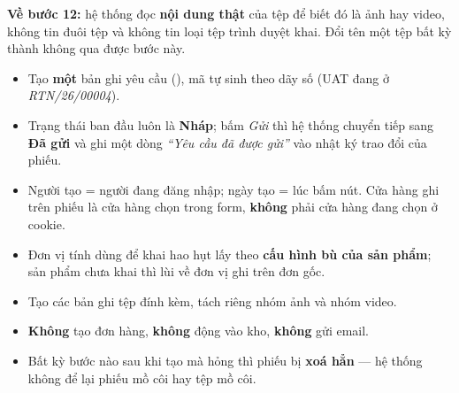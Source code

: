 \textbf{Về bước 12:} hệ thống đọc \textbf{nội dung thật} của tệp để biết đó là ảnh hay video,
không tin đuôi tệp và không tin loại tệp trình duyệt khai. Đổi tên một tệp bất kỳ thành
 không qua được bước này.

\mghi

\begin{itemize}[leftmargin=*]
  \item Tạo \textbf{một} bản ghi yêu cầu (), mã tự sinh theo dãy số
        (UAT đang ở \emph{RTN/26/00004}).
  \item Trạng thái ban đầu luôn là \textbf{Nháp}; bấm \emph{Gửi} thì hệ thống chuyển tiếp sang
        \textbf{Đã gửi} và ghi một dòng \emph{``Yêu cầu đã được gửi''} vào nhật ký trao đổi của
        phiếu.
  \item Người tạo = người đang đăng nhập; ngày tạo = lúc bấm nút. Cửa hàng ghi trên phiếu là
        cửa hàng chọn trong form, \textbf{không} phải cửa hàng đang chọn ở cookie.
  \item Đơn vị tính dùng để khai hao hụt lấy theo \textbf{cấu hình bù của sản phẩm}; sản phẩm
        chưa khai thì lùi về đơn vị ghi trên đơn gốc.
  \item Tạo các bản ghi tệp đính kèm, tách riêng nhóm ảnh và nhóm video.
  \item \textbf{Không} tạo đơn hàng, \textbf{không} động vào kho, \textbf{không} gửi email.
  \item Bất kỳ bước nào sau khi tạo mà hỏng thì phiếu bị \textbf{xoá hẳn} --- hệ thống không để
        lại phiếu mồ côi hay tệp mồ côi.
\end{itemize}

\mhoi

